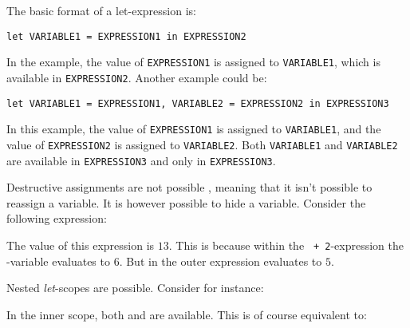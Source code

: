 The basic format of a let-expression is:

\texttt{let VARIABLE1 = EXPRESSION1 in EXPRESSION2}

In the example, the value of \texttt{EXPRESSION1} is assigned to \texttt{VARIABLE1}, which
is available in \texttt{EXPRESSION2}. Another example could be:

\texttt{let VARIABLE1 = EXPRESSION1, VARIABLE2 = EXPRESSION2 in EXPRESSION3}

In this example, the value of \texttt{EXPRESSION1} is assigned to \texttt{VARIABLE1}, and
the value of \texttt{EXPRESSION2} is assigned to \texttt{VARIABLE2}. Both \texttt{VARIABLE1}
and \texttt{VARIABLE2} are available in \texttt{EXPRESSION3} and only in \texttt{EXPRESSION3}.

Destructive assignments are not possible \productname{}, meaning that it isn't possible to 
reassign a variable. It is however possible to hide a variable.
Consider the following expression:


The value of this expression is $13$. This is because within the \texttt{ + 2}-expression
the -variable evaluates to $6$. But in the outer expression  evaluates to
$5$.

Nested \emph{let}-scopes are possible. Consider for instance:


In the inner scope, both  and  are available. This is of course equivalent
to:










%
%
%
%
%
%
%
%

